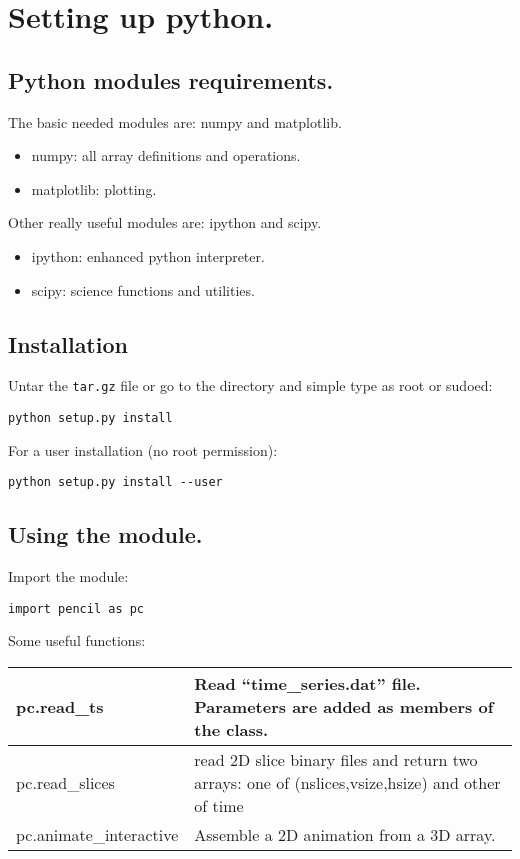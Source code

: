 \documentclass[a4paper,12pt]{article}
\begin{document}
\section{Setting up python.}
\subsection{Python modules requirements.}
The basic needed modules are: numpy and matplotlib.
\begin{itemize}
  \item numpy: all array definitions and operations.
  \item matplotlib: plotting.
\end{itemize}

Other really useful modules are: ipython and scipy.

\begin{itemize}
  \item ipython: enhanced python interpreter.
  \item scipy: science functions and utilities.
\end{itemize}


\subsection{Installation}
Untar the \texttt{tar.gz} file or go to the directory and simple type as root or sudoed:
\begin{verbatim}
python setup.py install
\end{verbatim}
For a user installation (no root permission):
\begin{verbatim}
python setup.py install --user
\end{verbatim}

\subsection{Using the module.}
Import the module:
\begin{verbatim}
import pencil as pc
\end{verbatim}
Some useful functions:
\begin{center}
\begin{tabular}{|l|l|}\hline
pc.read\_ts & Read ``time\_series.dat'' file. Parameters are added as members of the class. \\\hline
pc.read\_slices & read 2D slice binary files and return two arrays: one of (nslices,vsize,hsize) and other of time\\\hline
pc.animate\_interactive &  Assemble a 2D animation from a 3D array. \\\hline
\end{tabular}
\end{center}
\end{document}
